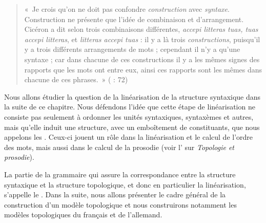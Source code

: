 \begin{quote}
    «~Je crois qu’on ne doit pas confondre \textit{construction} avec \textit{syntaxe}. Construction ne présente que l’idée de combinaison et d’arrangement. Cicéron a dit selon trois combinaisons différentes, \textit{accepi litteras tuas, tuas accepi litteras}, et \textit{litteras accepi tuas} : il y a là trois \textit{constructions}, puisqu’il y a trois différents arrangements de mots ; cependant il n’y a qu’une syntaxe ; car dans chacune de ces constructions il y a les mêmes signes des rapports que les mots ont entre eux, ainsi ces rapports sont les mêmes dans chacune de ces phrases.~» (\citealt{Dumarsais1754} : 72)
\end{quote}

Nous allons étudier la question de la linéarisation de la structure syntaxique dans la suite de ce chapitre. Nous défendons l'idée que cette étape de linéarisation ne consiste pas seulement à ordonner les unités syntaxiques, syntaxèmes et autres, mais qu'elle induit une structure, avec un emboîtement de constituants, que nous appelons les . Ceux-ci jouent un rôle dans la linéarisation et le calcul de l'ordre des mots, mais aussi dans le calcul de la prosodie (voir l’ sur \textit{Topologie et prosodie}).

La partie de la grammaire qui assure la correspondance entre la structure syntaxique et la structure topologique, et donc en particulier la linéarisation, s’appelle le . Dans la suite, nous allons présenter le cadre général de la construction d’un modèle topologique et nous construirons notamment les modèles topologiques du français et de l’allemand.

